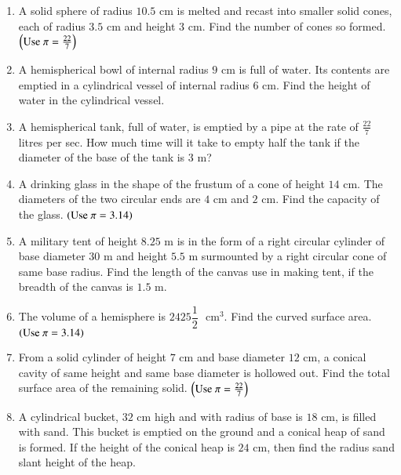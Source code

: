 \documentclass[journal,12pt,onecolumn]{IEEEtran}
\theoremstyle{remark}
\begin{document}
\begin{enumerate}
\item A solid sphere of radius $10.5 \text{ cm}$ is melted and recast into smaller solid cones, each of radius $3.5 \text{ cm}$ and height $3 \text{ cm}$. Find the number of cones so formed. $\left(\text{Use } \pi = \frac{22}{7}\right)$\\

\item A hemispherical bowl of internal radius $9 \text{ cm}$ is full of water. Its contents are emptied in a cylindrical vessel of internal radius $6 \text{ cm}$. Find the height of water in the cylindrical vessel.\\


\item A hemispherical tank, full of water, is emptied by a pipe at the rate of $\frac{22}{7}$ litres per sec. How much time will it take to empty half the tank if the diameter of the base of the tank is $3 \text{ m}$?\\

\item A drinking glass in the shape of the frustum of a cone of height $14 \text{ cm}$. The diameters of the two circular ends are $4 \text{ cm}$ and $2 \text{ cm}$. Find the capacity of the glass.  $\left(\text{Use } \pi = 3.14\right)$\\

\item  A military tent of height $8.25 \text{ m}$ is in the form of a right circular cylinder of base diameter $30 \text{ m}$ and height $5.5 \text{ m}$ surmounted by a right circular cone of same base radius. Find the length of the canvas use in making tent, if the breadth of the canvas is $1.5 \text{ m}$.\\

\item The volume of a hemisphere is $2425\dfrac{1}{2}$ $\text{ cm}^3$. Find the curved surface area.  $\left(\text{Use } \pi = 3.14\right)$\\

\item From a solid cylinder of height $7\text{ cm}$ and base diameter $12\text{ cm}$, a conical cavity of same height and same base diameter is hollowed out. Find the total surface area of the remaining solid. $\left(\text{Use } \pi = \frac{22}{7}\right)$\\

\item A cylindrical bucket, $32 \text{ cm}$ high and with radius of base is $18 \text{ cm}$, is filled with sand. This bucket is emptied on the ground and a conical heap of sand is formed. If the height of the conical heap is $24 \text{ cm}$, then find the radius sand slant height of the heap.\\



\end{enumerate}
\end{document}
